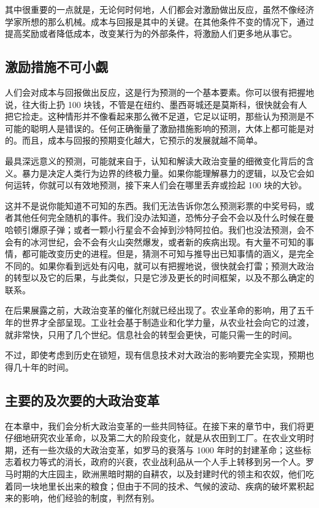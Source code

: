 其中很重要的一点就是，无论何时何地，人们都会对激励做出反应，虽然不像经济学家所想的那么机械。成本与回报是其中的关键。在其他条件不变的情况下，通过提高奖励或者降低成本，改变某行为的外部条件，将激励人们更多地从事它。

\subsection{激励措施不可小觑}
人们会对成本与回报做出反应，这是行为预测的一个基本要素。你可以很有把握地说，往大街上扔 100 块钱，不管是在纽约、墨西哥城还是莫斯科，很快就会有人把它捡走。这种情形并不像看起来那么微不足道，它足以证明，那些认为预测是不可能的聪明人是错误的。任何正确衡量了激励措施影响的预测，大体上都可能是对的。而且，成本与回报的预期变化越大，它预示的发展就越不简单。

最具深远意义的预测，可能就来自于，认知和解读大政治变量的细微变化背后的含义。暴力是决定人类行为边界的终极力量。如果你能理解暴力的逻辑，以及它会如何运转，你就可以有效地预测，接下来人们会在哪里丢弃或捡起 100 块的大钞。

这并不是说你能知道不可知的东西。我们无法告诉你怎么预测彩票的中奖号码，或者其他任何完全随机的事件。我们没办法知道，恐怖分子会不会以及什么时候在曼哈顿引爆原子弹；或者一颗小行星会不会掉到沙特阿拉伯。我们也没法预测，会不会有的冰河世纪，会不会有火山突然爆发，或者新的疾病出现。有大量不可知的事情，都可能改变历史的进程。但是，猜测不可知与推导出已知事情的涵义，是完全不同的。如果你看到远处有闪电，就可以有把握地说，很快就会打雷；预测大政治的转型以及它的后果，与此类似，只是它涉及更长的时间框架，以及不那么确定的联系。

在后果展露之前，大政治变革的催化剂就已经出现了。农业革命的影响，用了五千年的世界才全部呈现。工业社会基于制造业和化学力量，从农业社会向它的过渡，就非常快，只用了几个世纪。信息社会的转型会更快，可能只需一生的时间。

不过，即使考虑到历史在锁短，现有信息技术对大政治的影响要完全实现，预期也得几十年的时间。

\subsection{主要的及次要的大政治变革}
在本章中，我们会分析大政治变革的一些共同特征。在接下来的章节中，我们将更仔细地研究农业革命，以及第二大的阶段变化，就是从农田到工厂。在农业文明时期，还有一些次级的大政治变革，如罗马的衰落与 1000 年时的封建革命；这些标志着权力等式的消长，政府的兴衰，农业战利品从一个人手上转移到另一个人。罗马时期的大庄园主，欧洲黑暗时期的自耕农，以及封建时代的领主和农奴，他们吃着同一块地里长出来的粮食；但由于不同的技术、气候的波动、疾病的破坏累积起来的影响，他们经验的制度，判然有别。

